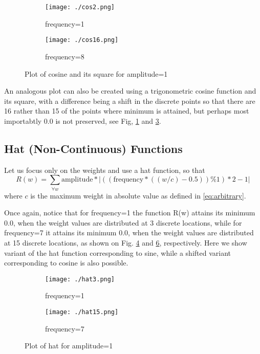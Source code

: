 \documentclass{article}
\newcommand{\squeeze}{\vspace{-2.5mm}}
\begin{document}
\begin{figure}[h]
 \begin{center}
  \begin{subfigure}[b]{0.49\textwidth}
   \texttt{[image: ./cos2.png]}
   \caption{frequency=1}
   \label{fig:cos2}
  \end{subfigure}
  \begin{subfigure}[b]{0.49\textwidth}
   \texttt{[image: ./cos16.png]}
   \caption{frequency=8}
   \label{fig:cos16}
  \end{subfigure}
  \caption{Plot of cosine and its square for amplitude=1}
  \squeeze \squeeze
 \end{center}
\end{figure}

\clearpage
\newpage

An analogous plot can also be created using a trigonometric cosine function and its square, with a difference being a shift in the discrete points so that there are 16 rather than 15 of the points where minimum is attained, but perhaps most importabtly $0.0$ is not preserved, see Fig, \ref{fig:cos2} and \ref{fig:cos16}.


\subsection{Hat (Non-Continuous) Functions}

Let us focus only on the weights and use a hat function, so that 
\begin{equation}
R(w) = \sum_{\forall w} \text{amplitude} * |((\text{frequency} * ((w/c)-0.5)) \% 1)*2 - 1| 
\label{eq:hat_non}
\end{equation}
where $c$ is the maximum weight in absolute value as defined in \eqref{eq:arbitrary}.

Once again, notice that for frequency=1 the function R(w) attains its minimum 0.0, when the weight values are distributed at 3 discrete locations, while for frequency=7 it attains its minimum 0.0, when the weight values are distributed at 15 discrete locations, as shown on Fig. \ref{fig:hat3} and \ref{fig:hat15}, respectively. Here we show variant of the hat function corresponding to sine, while a shifted variant corresponding to cosine is also possible. 

\begin{figure}[h]
 \begin{center}
  \begin{subfigure}[b]{0.49\textwidth}
    \texttt{[image: ./hat3.png]}
    \caption{frequency=1}
    \label{fig:hat3}
  \end{subfigure}
  \begin{subfigure}[b]{0.49\textwidth}
    \texttt{[image: ./hat15.png]}
    \caption{frequency=7}
    \label{fig:hat15}
  \end{subfigure}  
  \caption{Plot of hat for amplitude=1}
  \squeeze \squeeze
 \end{center}
\end{figure}
\end{document}
